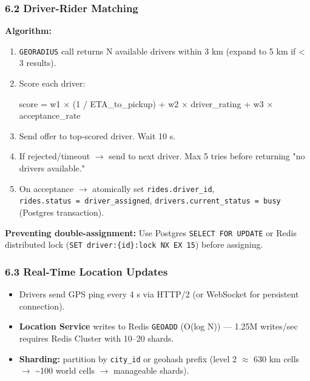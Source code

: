 \documentclass[11pt]{article}
\providecommand{\tightlist}{\setlength{\itemsep}{1pt}\setlength{\parskip}{0pt}}
\newenvironment{Shaded}{\begin{snugshade}}{\end{snugshade}}
\newcommand{\DecValTok}[1]{\textcolor[rgb]{0.96,0.45,0.00}{#1}}
\newcommand{\NormalTok}[1]{\textcolor[rgb]{0.81,0.81,0.76}{#1}}
\newcommand{\OperatorTok}[1]{\textcolor[rgb]{0.81,0.81,0.76}{#1}}
\begin{document}
\subsubsection{6.2 Driver-Rider Matching}\label{62-driver-rider-matching}

\textbf{Algorithm:}

\begin{enumerate}
\def\labelenumi{\arabic{enumi}.}
\tightlist
\item
  \texttt{GEORADIUS} call returns N available drivers within 3 km (expand to 5 km if \textless{} 3 results).
\item
  Score each driver:


\begin{Shaded}
\begin{Highlighting}[]
\NormalTok{score }\OperatorTok{=}\NormalTok{ w1 × (}\DecValTok{1} \OperatorTok{/}\NormalTok{ ETA\_to\_pickup) }\OperatorTok{+}\NormalTok{ w2 × driver\_rating }\OperatorTok{+}\NormalTok{ w3 × acceptance\_rate}
\end{Highlighting}
\end{Shaded}
\item
  Send offer to top-scored driver. Wait 10 s.
\item
  If rejected/timeout \(\rightarrow\) send to next driver. Max 5 tries before returning "no drivers available."
\item
  On acceptance \(\rightarrow\) atomically set \texttt{rides.driver\_id}, \texttt{rides.status\ =\ driver\_assigned}, \texttt{drivers.current\_status\ =\ busy} (Postgres transaction).
\end{enumerate}

\textbf{Preventing double-assignment:} Use Postgres \texttt{SELECT\ FOR\ UPDATE} or Redis distributed lock (\texttt{SET\ driver:\{id\}:lock\ NX\ EX\ 15}) before assigning.

\subsubsection{6.3 Real-Time Location Updates}\label{63-real-time-location-updates}

\begin{itemize}
\tightlist
\item
  Drivers send GPS ping every 4 s via HTTP/2 (or WebSocket for persistent connection).
\item
  \textbf{Location Service} writes to Redis \texttt{GEOADD} (O(log N)) --- 1.25M writes/sec requires Redis Cluster with 10--20 shards.
\item
  \textbf{Sharding:} partition by \texttt{city\_id} or geohash prefix (level 2 \(\approx\) 630 km cells \(\rightarrow\) \textasciitilde100 world cells \(\rightarrow\) manageable shards).
\end{itemize}
\end{document}
